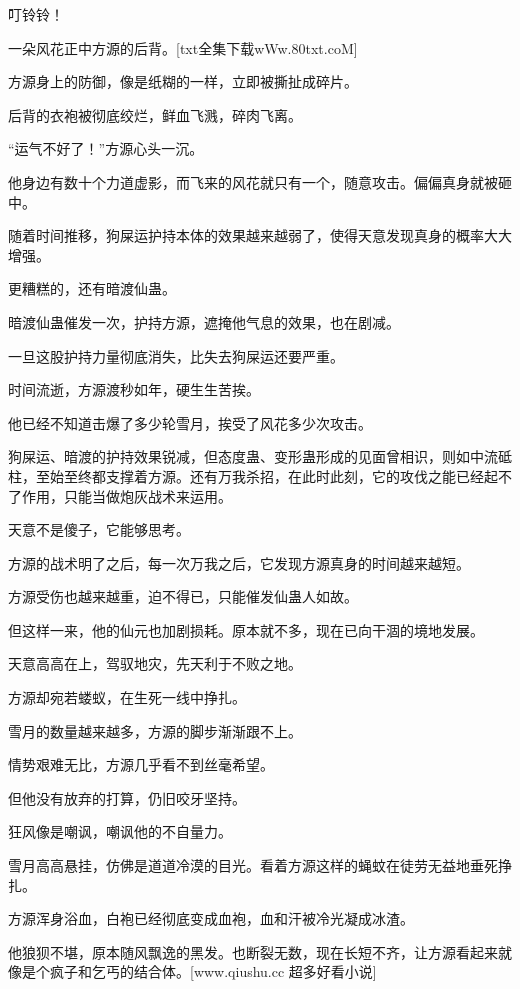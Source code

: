 
\begin{this_body}

叮铃铃！

一朵风花正中方源的后背。[txt全集下载wWw.80txt.coM]

方源身上的防御，像是纸糊的一样，立即被撕扯成碎片。

后背的衣袍被彻底绞烂，鲜血飞溅，碎肉飞离。

“运气不好了！”方源心头一沉。

他身边有数十个力道虚影，而飞来的风花就只有一个，随意攻击。偏偏真身就被砸中。

随着时间推移，狗屎运护持本体的效果越来越弱了，使得天意发现真身的概率大大增强。

更糟糕的，还有暗渡仙蛊。

暗渡仙蛊催发一次，护持方源，遮掩他气息的效果，也在剧减。

一旦这股护持力量彻底消失，比失去狗屎运还要严重。

时间流逝，方源渡秒如年，硬生生苦挨。

他已经不知道击爆了多少轮雪月，挨受了风花多少次攻击。

狗屎运、暗渡的护持效果锐减，但态度蛊、变形蛊形成的见面曾相识，则如中流砥柱，至始至终都支撑着方源。还有万我杀招，在此时此刻，它的攻伐之能已经起不了作用，只能当做炮灰战术来运用。

天意不是傻子，它能够思考。

方源的战术明了之后，每一次万我之后，它发现方源真身的时间越来越短。

方源受伤也越来越重，迫不得已，只能催发仙蛊人如故。

但这样一来，他的仙元也加剧损耗。原本就不多，现在已向干涸的境地发展。

天意高高在上，驾驭地灾，先天利于不败之地。

方源却宛若蝼蚁，在生死一线中挣扎。

雪月的数量越来越多，方源的脚步渐渐跟不上。

情势艰难无比，方源几乎看不到丝毫希望。

但他没有放弃的打算，仍旧咬牙坚持。

狂风像是嘲讽，嘲讽他的不自量力。

雪月高高悬挂，仿佛是道道冷漠的目光。看着方源这样的蝇蚊在徒劳无益地垂死挣扎。

方源浑身浴血，白袍已经彻底变成血袍，血和汗被冷光凝成冰渣。

他狼狈不堪，原本随风飘逸的黑发。也断裂无数，现在长短不齐，让方源看起来就像是个疯子和乞丐的结合体。[www.qiushu.cc 超多好看小说]


\end{this_body}
